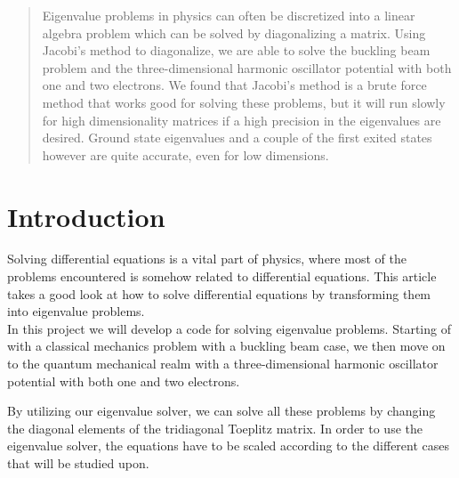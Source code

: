 \documentclass[twoside,onecolumn]{article}
\begin{document}
\tableofcontents
\newpage
\begin{abstract}
Eigenvalue problems in physics can often be discretized into a linear algebra problem which can be solved by diagonalizing a matrix. Using Jacobi's method to diagonalize, we are able to solve the buckling beam problem and the three-dimensional harmonic oscillator potential with both one and two electrons. We found that Jacobi's method is a brute force method that works good for solving these problems, but it will run slowly for high dimensionality matrices if a high precision in the eigenvalues are desired. Ground state eigenvalues and a couple of the first exited states however are quite accurate, even for low dimensions. 
\end{abstract}


\section{Introduction}
Solving differential equations is a vital part of physics, where most of the problems encountered is somehow related to differential equations. This article takes a good look at how to solve differential equations by transforming them into eigenvalue problems. \\
In this project we will develop a code for solving eigenvalue problems. Starting of with a classical mechanics problem with a buckling beam case, we then move on to the quantum mechanical realm with a three-dimensional harmonic oscillator potential with both one and two electrons.

\bigskip

By utilizing our eigenvalue solver, we can solve all these problems by changing the diagonal elements of the tridiagonal Toeplitz matrix. In order to use the eigenvalue solver, the equations have to be scaled according to the different cases that will be studied upon.
\end{document}
